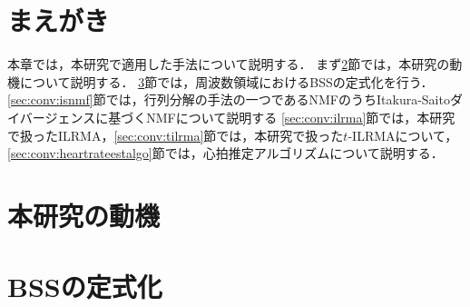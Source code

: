 \section{まえがき}
本章では，本研究で適用した手法について説明する．
まず\ref{sec:conv:researchmotivation}節では，本研究の動機について説明する．
\ref{sec:conv:bssformularization}節では，周波数領域におけるBSSの定式化を行う．
\ref{sec:conv:isnmf}節では，行列分解の手法の一つであるNMFのうちItakura-Saitoダイバージェンスに基づくNMFについて説明する
\ref{sec:conv:ilrma}節では，本研究で扱ったILRMA，\ref{sec:conv:tilrma}節では，本研究で扱った$t$-ILRMAについて，\ref{sec:conv:heartrateestalgo}節では，心拍推定アルゴリズムについて説明する．

\section{本研究の動機}
\label{sec:conv:researchmotivation}

\section{BSSの定式化}
\label{sec:conv:bssformularization}

